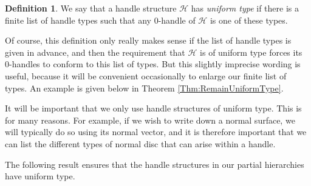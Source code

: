 \documentclass[oneside]{amsart}
\numberwithin{equation}{section}
\theoremstyle{plain}
\theoremstyle{definition}
\newtheorem{definition}[equation]{Definition}
\begin{document}
\begin{definition}
\label{Def:UniformType}
We say that a handle structure $\mathcal{H}$ has \emph{uniform type} if there is a finite list of handle types such that any 0-handle of $\mathcal{H}$ is one of these types.
\end{definition}

Of course, this definition only really makes sense if the list of handle types is given in advance, and then the requirement that $\mathcal{H}$ is of uniform type forces its 0-handles to conform to this list of types. But this slightly imprecise wording is useful, because it will be convenient occasionally to enlarge our finite list of types. An example is given below in Theorem \ref{Thm:RemainUniformType}.

It will be important that we only use handle structures of uniform type. This is for many reasons. For example, if we wish to write down a normal surface, we will typically do so using its normal vector, and it is therefore important that we can list the different types of normal disc that can arise within a handle. 



The following result ensures that the handle structures in our partial hierarchies have uniform type.
\end{document}
